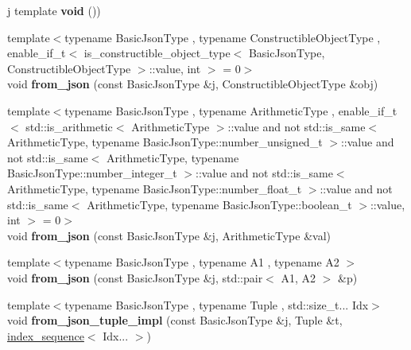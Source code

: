 \begin{DoxyCompactItemize}
\mbox{\label{namespacenlohmann_1_1detail_a59fca69799f6b9e366710cb9043aa77d}} 
j template {\bfseries void} ())
\item 
\mbox{\label{namespacenlohmann_1_1detail_a5b24896e5f5db6af06d939dde4b63fe1}} 
{\footnotesize template$<$typename Basic\+Json\+Type , typename Constructible\+Object\+Type , enable\+\_\+if\+\_\+t$<$ is\+\_\+constructible\+\_\+object\+\_\+type$<$ Basic\+Json\+Type, Constructible\+Object\+Type $>$\+::value, int $>$  = 0$>$ }\\void {\bfseries from\+\_\+json} (const Basic\+Json\+Type \&j, Constructible\+Object\+Type \&obj)
\item 
\mbox{\label{namespacenlohmann_1_1detail_a839b0ab50d2c9bce669068f56bc41202}} 
{\footnotesize template$<$typename Basic\+Json\+Type , typename Arithmetic\+Type , enable\+\_\+if\+\_\+t$<$ std\+::is\+\_\+arithmetic$<$ Arithmetic\+Type $>$\+::value and not std\+::is\+\_\+same$<$ Arithmetic\+Type, typename Basic\+Json\+Type\+::number\+\_\+unsigned\+\_\+t $>$\+::value and not std\+::is\+\_\+same$<$ Arithmetic\+Type, typename Basic\+Json\+Type\+::number\+\_\+integer\+\_\+t $>$\+::value and not std\+::is\+\_\+same$<$ Arithmetic\+Type, typename Basic\+Json\+Type\+::number\+\_\+float\+\_\+t $>$\+::value and not std\+::is\+\_\+same$<$ Arithmetic\+Type, typename Basic\+Json\+Type\+::boolean\+\_\+t $>$\+::value, int $>$  = 0$>$ }\\void {\bfseries from\+\_\+json} (const Basic\+Json\+Type \&j, Arithmetic\+Type \&val)
\item 
\mbox{\label{namespacenlohmann_1_1detail_aae9f9c2601074e323d49428132cc293d}} 
{\footnotesize template$<$typename Basic\+Json\+Type , typename A1 , typename A2 $>$ }\\void {\bfseries from\+\_\+json} (const Basic\+Json\+Type \&j, std\+::pair$<$ A1, A2 $>$ \&p)
\item 
\mbox{\label{namespacenlohmann_1_1detail_a28253915d9db4a0112d60eaee0422949}} 
{\footnotesize template$<$typename Basic\+Json\+Type , typename Tuple , std\+::size\+\_\+t... Idx$>$ }\\void {\bfseries from\+\_\+json\+\_\+tuple\+\_\+impl} (const Basic\+Json\+Type \&j, Tuple \&t, \mbox{\hyperlink{structnlohmann_1_1detail_1_1index__sequence}{index\+\_\+sequence}}$<$ Idx... $>$)

\end{DoxyCompactItemize}
